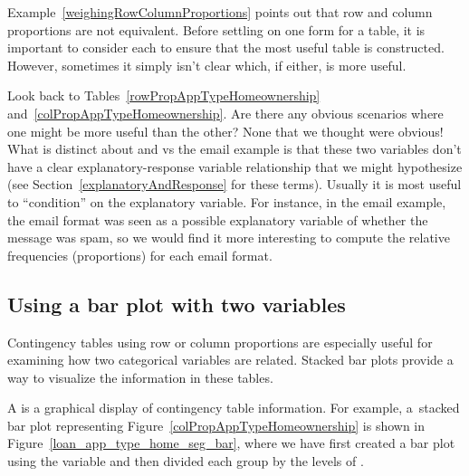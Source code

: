 Example~\ref{weighingRowColumnProportions} points out
that row and column proportions are not equivalent.
Before settling on one form for a table,
it is important to consider each to ensure that the
most useful table is constructed.
However, sometimes it simply isn't clear which, if either,
is more useful.

\begin{examplewrap}
\begin{nexample}{Look back to
    Tables~\ref{rowPropAppTypeHomeownership}
    and~\ref{colPropAppTypeHomeownership}.
    Are there any obvious scenarios where one might be more
    useful than the other?}
  None that we thought were obvious!
  What is distinct about 
  and  vs the email example is that
  these two variables don't have a clear explanatory-response
  variable relationship that we might hypothesize
  (see Section~\ref{explanatoryAndResponse} for these terms).
  Usually it is most useful to ``condition'' on the
  explanatory variable.
  For instance, in the email example, the email format
  was seen as a possible explanatory variable of whether
  the message was spam, so we would find it more interesting
  to compute the relative frequencies (proportions)
  for each email format.
\end{nexample}
\end{examplewrap}



\subsection{Using a bar plot with two variables}
\label{bar_plots_subsection}

Contingency tables using row or column proportions
are especially useful for examining how two categorical
variables are related.
Stacked bar plots provide a way to visualize
the information in these tables.

A 
is a graphical display of contingency table information.
For example, a~stacked bar plot representing
Figure~\ref{colPropAppTypeHomeownership}
is shown in Figure~\ref{loan_app_type_home_seg_bar},
where we have first created a bar plot using the
 variable and then divided each group
by the levels of \mbox{}.

